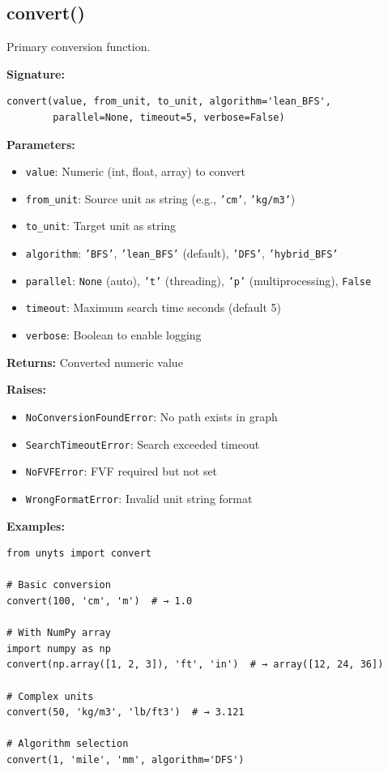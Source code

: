 \documentclass[11pt,a4paper]{report}
\begin{document}
\subsection{convert()}

Primary conversion function.

\textbf{Signature:}
\begin{lstlisting}[style=pythonstyle]
convert(value, from_unit, to_unit, algorithm='lean_BFS', 
        parallel=None, timeout=5, verbose=False)
\end{lstlisting}

\textbf{Parameters:}
\begin{itemize}
\item \texttt{value}: Numeric (int, float, array) to convert
\item \texttt{from\_unit}: Source unit as string (e.g., \texttt{'cm'}, \texttt{'kg/m3'})
\item \texttt{to\_unit}: Target unit as string
\item \texttt{algorithm}: \texttt{'BFS'}, \texttt{'lean\_BFS'} (default), \texttt{'DFS'}, \texttt{'hybrid\_BFS'}
\item \texttt{parallel}: \texttt{None} (auto), \texttt{'t'} (threading), \texttt{'p'} (multiprocessing), \texttt{False}
\item \texttt{timeout}: Maximum search time seconds (default 5)
\item \texttt{verbose}: Boolean to enable logging
\end{itemize}

\textbf{Returns:} Converted numeric value

\textbf{Raises:}
\begin{itemize}
\item \texttt{NoConversionFoundError}: No path exists in graph
\item \texttt{SearchTimeoutError}: Search exceeded timeout
\item \texttt{NoFVFError}: FVF required but not set
\item \texttt{WrongFormatError}: Invalid unit string format
\end{itemize}

\textbf{Examples:}
\begin{lstlisting}[style=pythonstyle]
from unyts import convert

# Basic conversion
convert(100, 'cm', 'm')  # → 1.0

# With NumPy array
import numpy as np
convert(np.array([1, 2, 3]), 'ft', 'in')  # → array([12, 24, 36])

# Complex units
convert(50, 'kg/m3', 'lb/ft3')  # → 3.121

# Algorithm selection
convert(1, 'mile', 'mm', algorithm='DFS')
\end{lstlisting}
\end{document}
